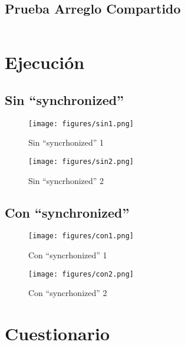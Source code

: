 \documentclass[12pt]{article}
\begin{document}
\subsection*{Prueba Arreglo Compartido}
\inputminted{Java}{PruebaArregloCompartido.java}

\section*{Ejecución}

\subsection*{Sin ``synchronized''}
\begin{figure}[ht!]
  \centering
  \texttt{[image: figures/sin1.png]}
  \caption{Sin ``syncrhonized'' 1}
\end{figure}

\begin{figure}[ht!]
  \centering
  \texttt{[image: figures/sin2.png]}
  \caption{Sin ``syncrhonized'' 2}
\end{figure}

\subsection*{Con ``synchronized''}
\begin{figure}[ht!]
  \centering
  \texttt{[image: figures/con1.png]}
  \caption{Con ``syncrhonized'' 1}
\end{figure}

\begin{figure}[ht!]
  \centering
  \texttt{[image: figures/con2.png]}
  \caption{Con ``syncrhonized'' 2}
\end{figure}

\section*{Cuestionario}
\end{document}
